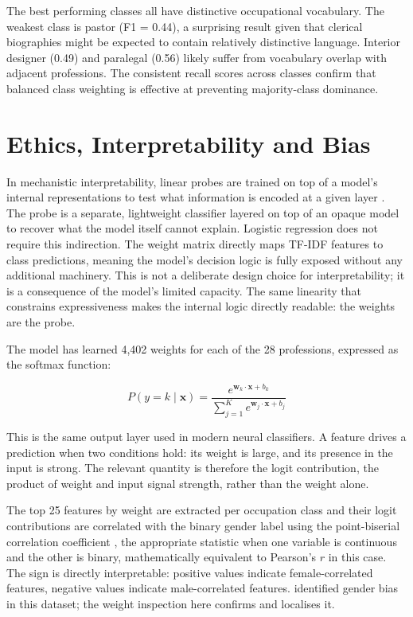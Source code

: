 \documentclass[11pt, a4paper]{article}
\begin{document}
The best performing classes all have distinctive occupational vocabulary. 
The weakest class is pastor (F1 = 0.44), a surprising result given that 
clerical biographies might be expected to contain relatively distinctive 
language. Interior designer (0.49) and paralegal (0.56) likely suffer from 
vocabulary overlap with adjacent professions. The consistent recall scores 
across classes confirm that balanced class weighting is effective at 
preventing majority-class dominance.

\section{Ethics, Interpretability and Bias}

In mechanistic interpretability, linear probes are trained on top of a 
model's internal representations to test what information is encoded at a 
given layer \citep{alain2016understanding}. The probe is a separate, 
lightweight classifier layered on top of an opaque model to recover what 
the model itself cannot explain. Logistic regression does not require this 
indirection. The weight matrix directly maps TF-IDF features to class 
predictions, meaning the model's decision logic is fully exposed without 
any additional machinery. This is not a deliberate design choice for 
interpretability; it is a consequence of the model's limited capacity. 
The same linearity that constrains expressiveness makes the internal logic 
directly readable: the weights are the probe.

The model has learned 4,402 weights for each of the 28 professions, 
expressed as the softmax function:

$$P(y = k \mid \mathbf{x}) = \frac{e^{\mathbf{w}_k \cdot \mathbf{x} + 
b_k}}{\sum_{j=1}^{K} e^{\mathbf{w}_j \cdot \mathbf{x} + b_j}}$$

This is the same output layer used in modern neural classifiers. A feature 
drives a prediction when two conditions hold: its weight is large, and its 
presence in the input is strong. The relevant quantity is therefore the 
logit contribution, the product of weight and input signal strength, rather 
than the weight alone.

The top 25 features by weight are extracted per occupation class and their 
logit contributions are correlated with the binary gender label using the 
point-biserial correlation coefficient \citep{lev1949point}, the appropriate 
statistic when one variable is continuous and the other is binary, 
mathematically equivalent to Pearson's $r$ in this case. The sign is 
directly interpretable: positive values indicate female-correlated features, 
negative values indicate male-correlated features. \citet{de2019bias} 
identified gender bias in this dataset; the weight inspection here confirms 
and localises it.
\end{document}
